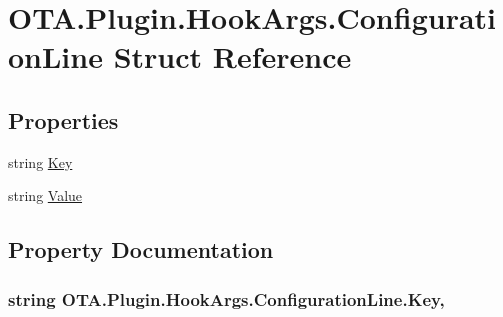 \hypertarget{struct_o_t_a_1_1_plugin_1_1_hook_args_1_1_configuration_line}{}\section{O\+T\+A.\+Plugin.\+Hook\+Args.\+Configuration\+Line Struct Reference}
\label{struct_o_t_a_1_1_plugin_1_1_hook_args_1_1_configuration_line}
\subsection*{Properties}
\begin{DoxyCompactItemize}
\item 
string \hyperlink{struct_o_t_a_1_1_plugin_1_1_hook_args_1_1_configuration_line_aeab160218f375f2d5edbc9250dad87db}{Key}
\item 
string \hyperlink{struct_o_t_a_1_1_plugin_1_1_hook_args_1_1_configuration_line_a916ffb49d740399dbd024b7f80c41012}{Value}
\end{DoxyCompactItemize}


\subsection{Property Documentation}
\hypertarget{struct_o_t_a_1_1_plugin_1_1_hook_args_1_1_configuration_line_aeab160218f375f2d5edbc9250dad87db}{}
\subsubsection[{Key}]{\setlength{\rightskip}{0pt plus 5cm}string O\+T\+A.\+Plugin.\+Hook\+Args.\+Configuration\+Line.\+Key\hspace{0.3cm}{\ttfamily [get]}, {\ttfamily [set]}}\label{struct_o_t_a_1_1_plugin_1_1_hook_args_1_1_configuration_line_aeab160218f375f2d5edbc9250dad87db}
\hypertarget{struct_o_t_a_1_1_plugin_1_1_hook_args_1_1_configuration_line_a916ffb49d740399dbd024b7f80c41012}{}
